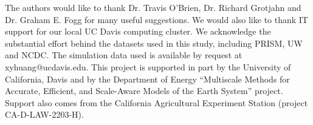 \documentclass[draft,ms]{agutex}   %
\begin{document}
\begin{article}
\begin{acknowledgments}

The authors would like to thank Dr. Travis O'Brien, Dr. Richard Grotjahn and Dr. Graham E. Fogg for many useful suggestions. We would also like to thank IT support for our local UC Davis computing cluster. We acknowledge the substantial effort behind the datasets used in this study, including PRISM, UW and NCDC. The simulation data used is available by request at xyhuang@ucdavis.edu. This project is supported in part by the University of California, Davis and by the Department of Energy ``Multiscale Methods for Accurate, Efficient, and Scale-Aware Models of the Earth System'' project. Support also comes from the California Agricultural Experiment Station (project CA-D-LAW-2203-H). 

\end{acknowledgments}





\end{article}


\clearpage
\end{document}
